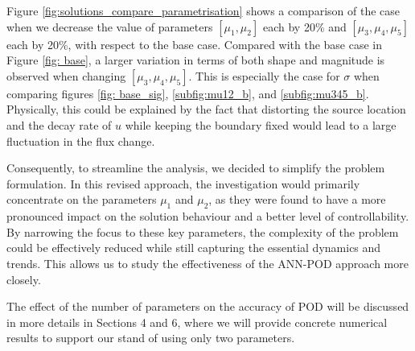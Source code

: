 Figure \ref{fig:solutions_compare_parametrisation} shows a comparison of the case when we decrease the value of parameters $[\mu_1, \mu_2]$ each by 20\% and  $[\mu_3, \mu_4, \mu_5]$ each by 20\%, with respect to the base case. Compared with the base case in Figure \ref{fig: base}, a larger variation in terms of both shape and magnitude is observed when changing  $[\mu_3, \mu_4, \mu_5]$.  This is especially the case for $\sigma$ when comparing figures \ref{fig: base_sig}, \ref{subfig:mu12_b}, and \ref{subfig:mu345_b}. Physically, this could be explained by the fact that distorting the source location and the decay rate of $u$ while keeping the boundary fixed would lead to a large fluctuation in the flux change.

Consequently, to streamline the analysis, we decided to simplify the problem formulation. In this revised approach, the investigation would primarily concentrate on the parameters $\mu_1$ and $\mu_2$, as they were found to have a more pronounced impact on the solution behaviour and a better level of controllability. By narrowing the focus to these key parameters, the complexity of the problem could be effectively reduced while still capturing the essential dynamics and trends. This allows us to study the effectiveness of the ANN-POD approach more closely. 

The effect of the number of parameters on the accuracy of POD will be discussed in more details in Sections 4 and 6, where we will provide concrete numerical results to support our stand of using only two parameters.

\newpage